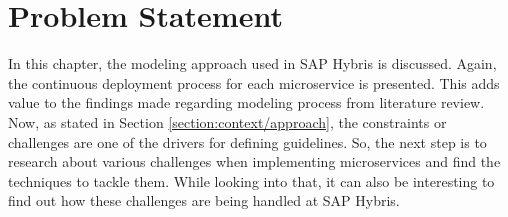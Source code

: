 \section{Problem Statement}\label{section: hybris_architecture/problem_statement}
In this chapter, the modeling approach used in SAP Hybris is discussed. Again, the continuous deployment process for each microservice is presented. This adds value to the findings made regarding modeling process from literature review. Now, as stated in Section \ref{section:context/approach}, the constraints or challenges are one of the drivers for defining guidelines. So, the next step is to research about various challenges when implementing microservices and find the techniques to tackle them. While looking into that, it can also be interesting to find out how these challenges are being handled at SAP Hybris.












